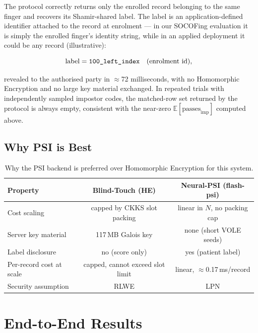 \documentclass[11pt]{article}
\begin{document}
The protocol correctly returns only the enrolled record belonging to the same finger and
recovers its Shamir-shared label. The label is an application-defined identifier attached to
the record at enrolment --- in our SOCOFing evaluation it is simply the enrolled finger's
identity string, while in an applied deployment it could be any record (illustrative):

\begin{equation}
\text{label} = \text{\texttt{100\_left\_index}} \quad \text{(enrolment id)},
\end{equation}

revealed to the authorised party in $\approx$72 milliseconds, with no Homomorphic Encryption and
no large key material exchanged. In repeated trials with independently sampled impostor
codes, the matched-row set returned by the protocol is always empty, consistent with the
near-zero $\mathbb{E}[\text{passes}_{\text{imp}}]$ computed above.

\subsection{Why PSI is Best}

\begin{table}[h]
\centering
\begin{tabular}{lcc}
\toprule
Property & Blind-Touch (HE) & Neural-PSI (flash-psi) \\
\midrule
Cost scaling             & capped by CKKS slot packing & linear in $N$, no packing cap \\
Server key material      & 117\,MB Galois key   & none (short VOLE seeds) \\
Label disclosure         & no (score only)       & yes (patient label) \\
Per-record cost at scale & capped, cannot exceed slot limit & linear, $\approx$0.17\,ms/record \\
Security assumption      & RLWE                  & LPN \\
\bottomrule
\end{tabular}
\caption{Why the PSI backend is preferred over Homomorphic Encryption for this system.}
\label{tab:he-vs-psi}
\end{table}

\section{End-to-End Results}
\end{document}
